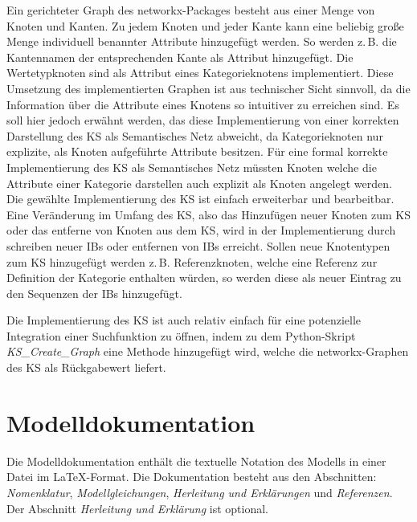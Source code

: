 Ein gerichteter Graph des networkx-Packages besteht aus einer Menge von Knoten und Kanten. Zu jedem Knoten und jeder Kante kann eine beliebig große Menge individuell benannter Attribute hinzugefügt werden. So werden z.\,B. die Kantennamen der entsprechenden Kante als Attribut hinzugefügt. Die Wertetypknoten sind als Attribut eines Kategorieknotens implementiert. Diese Umsetzung des implementierten Graphen ist aus technischer Sicht sinnvoll, da die Information über die Attribute eines Knotens so intuitiver zu erreichen sind. Es soll hier jedoch erwähnt werden, das diese Implementierung von einer korrekten Darstellung des KS als Semantisches Netz abweicht, da Kategorieknoten nur explizite, als Knoten aufgeführte Attribute besitzen. Für eine formal korrekte Implementierung des KS als Semantisches Netz müssten Knoten welche die Attribute einer Kategorie darstellen auch explizit als Knoten angelegt werden.\\
Die gewählte Implementierung des KS ist einfach erweiterbar und bearbeitbar. Eine Veränderung im Umfang des KS, also das Hinzufügen neuer Knoten zum KS oder das entferne von Knoten aus dem KS, wird in der Implementierung durch schreiben neuer IB\grq s oder entfernen von IB\grq s erreicht. Sollen neue Knotentypen zum KS hinzugefügt werden z.\,B. Referenzknoten, welche eine Referenz zur Definition der Kategorie enthalten würden, so werden diese als neuer Eintrag zu den Sequenzen der IB\grq s hinzugefügt.

Die Implementierung des KS ist auch relativ einfach für eine potenzielle Integration einer Suchfunktion zu öffnen, indem zu dem Python-Skript \textit{KS\_Create\_Graph} eine Methode hinzugefügt wird, welche die networkx-Graphen des KS als Rückgabewert liefert.  

\section{Modelldokumentation}
\label{Ch:Ergebnisse:Sec:Dokumentation}
Die Modelldokumentation enthält die textuelle Notation des Modells in einer Datei im \LaTeX-Format. Die Dokumentation besteht aus den Abschnitten: \textit{Nomenklatur}, \textit{Modellgleichungen}, \textit{Herleitung und Erklärungen} und \textit{Referenzen}. Der Abschnitt \textit{Herleitung und Erklärung} ist optional.

